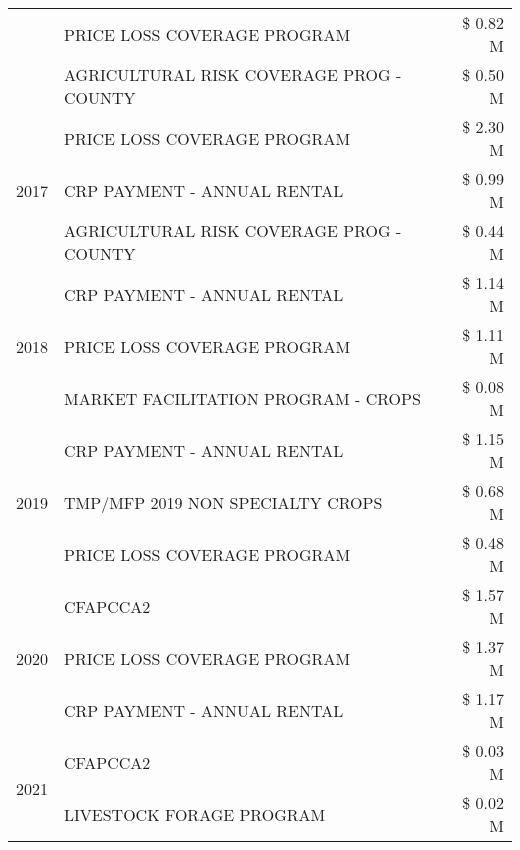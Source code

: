 \begin{tabular}{llr}
 & PRICE LOSS COVERAGE PROGRAM & \$ 0.82 M \\
 & AGRICULTURAL RISK COVERAGE PROG - COUNTY & \$ 0.50 M \\
\cline{1-3}
\multirow[t]{3}{*}{2017} & PRICE LOSS COVERAGE PROGRAM & \$ 2.30 M \\
 & CRP PAYMENT - ANNUAL RENTAL & \$ 0.99 M \\
 & AGRICULTURAL RISK COVERAGE PROG - COUNTY & \$ 0.44 M \\
\cline{1-3}
\multirow[t]{3}{*}{2018} & CRP PAYMENT - ANNUAL RENTAL & \$ 1.14 M \\
 & PRICE LOSS COVERAGE PROGRAM & \$ 1.11 M \\
 & MARKET FACILITATION PROGRAM - CROPS & \$ 0.08 M \\
\cline{1-3}
\multirow[t]{3}{*}{2019} & CRP PAYMENT - ANNUAL RENTAL & \$ 1.15 M \\
 & TMP/MFP 2019 NON SPECIALTY CROPS & \$ 0.68 M \\
 & PRICE LOSS COVERAGE PROGRAM & \$ 0.48 M \\
\cline{1-3}
\multirow[t]{3}{*}{2020} & CFAPCCA2 & \$ 1.57 M \\
 & PRICE LOSS COVERAGE PROGRAM & \$ 1.37 M \\
 & CRP PAYMENT - ANNUAL RENTAL & \$ 1.17 M \\
\cline{1-3}
\multirow[t]{2}{*}{2021} & CFAPCCA2 & \$ 0.03 M \\
 & LIVESTOCK FORAGE PROGRAM & \$ 0.02 M \\
\cline{1-3}
\bottomrule
\end{tabular}
